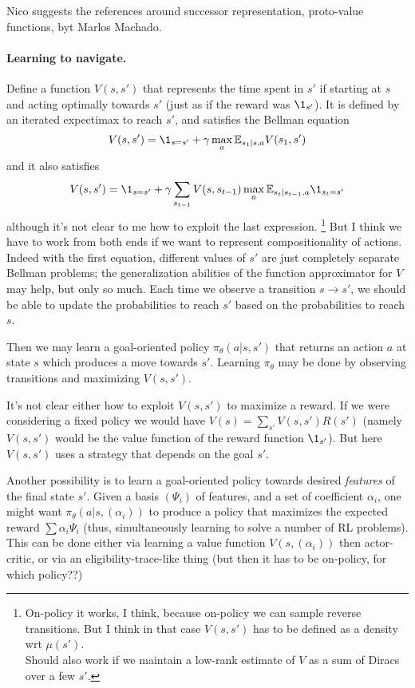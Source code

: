 \documentclass[11pt,a4paper]{article}
\begin{document}
Nico suggests the references around successor representation, proto-value
functions, byt Marlos Machado.

\paragraph{Learning to navigate.} Define a function $V(s,s')$ that
represents the time spent in $s'$ if starting at $s$ and acting optimally
towards $s'$ (just as if the reward was $\1_{s'}$). It is defined by an iterated expectimax to reach $s'$, and
satisfies the Bellman equation
\begin{equation}
V(s,s')=\1_{s=s'}+\gamma \max_a \E_{s_1|s,a} V(s_1,s')
\end{equation}
and it also satisfies
\begin{equation}
V(s,s')=\1_{s=s'}+\gamma \sum_{s_{t-1}} V(s,s_{t-1})\max_a
\E_{s_t|s_{t-1},a}\1_{s_t=s'}
\end{equation}
although it's not clear to me how to exploit the last expression. 
\footnote{On-policy it works, I think, because on-policy we can sample
reverse transitions. But I think in that case $V(s,s')$ has to be defined
as a density wrt $\mu(s')$.\\Should also work if we maintain a low-rank
estimate of $V$ as a sum of Diracs over a few $s'$.}
But I
think we have to work from both ends if we want to represent
compositionality of actions. Indeed with the first equation, different values
of $s'$ are just completely separate Bellman problems; the generalization
abilities of the function approximator for $V$ may help, but only so
much. Each time we observe a transition $s\to s'$, we should be able to
update the probabilities to reach $s'$ based on the probabilities to
reach $s$.

Then we may learn a goal-oriented policy $\pi_\theta(a|s,s')$ that returns an
action $a$ at state $s$ which produces a move towards $s'$. Learning
$\pi_\theta$ may be done by observing transitions and maximizing
$V(s,s')$.

It's not clear either how to exploit $V(s,s')$ to maximize a reward. If
we were considering a fixed policy we would have
$V(s)=\sum_{s'}V(s,s')R(s')$ (namely $V(s,s')$ would be the value
function of the reward function $\1_{s'}$). But here $V(s,s')$ uses a
strategy that depends on the goal $s'$.

Another possibility is to learn a goal-oriented policy towards desired
\emph{features} of the final state $s'$. Given a basis $(\Psi_i)$ of
features, and a set of coefficient $\alpha_i$, one might want
$\pi_\theta(a|s,(\alpha_i))$ to produce a policy that maximizes the
expected reward $\sum \alpha_i \Psi_i$ (thus, simultaneously learning to
solve a number of RL problems). 
This can be done either via learning a value function $V(s,(\alpha_i))$
then actor-critic, or via an eligibility-trace-like thing (but then it
has to be on-policy, for which policy??)
\end{document}
